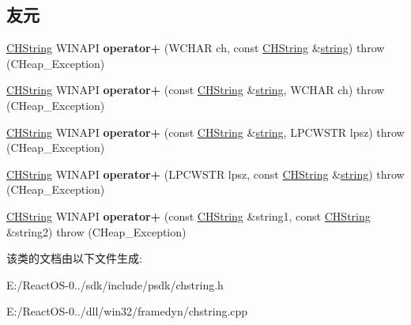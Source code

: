 \subsection*{友元}
\begin{DoxyCompactItemize}
\item 
\mbox{\label{class_c_h_string_af47004e928bdd92e10b5f0346fbd4273}} 
\hyperlink{class_c_h_string}{C\+H\+String} W\+I\+N\+A\+PI {\bfseries operator+} (W\+C\+H\+AR ch, const \hyperlink{class_c_h_string}{C\+H\+String} \&\hyperlink{structstring}{string})  throw (\+C\+Heap\+\_\+\+Exception)
\item 
\mbox{\label{class_c_h_string_a85e60148ad794abec3ebe0998f1c4f03}} 
\hyperlink{class_c_h_string}{C\+H\+String} W\+I\+N\+A\+PI {\bfseries operator+} (const \hyperlink{class_c_h_string}{C\+H\+String} \&\hyperlink{structstring}{string}, W\+C\+H\+AR ch)  throw (\+C\+Heap\+\_\+\+Exception)
\item 
\mbox{\label{class_c_h_string_aaabda75596267e0b9640065e272c1d9f}} 
\hyperlink{class_c_h_string}{C\+H\+String} W\+I\+N\+A\+PI {\bfseries operator+} (const \hyperlink{class_c_h_string}{C\+H\+String} \&\hyperlink{structstring}{string}, L\+P\+C\+W\+S\+TR lpsz)  throw (\+C\+Heap\+\_\+\+Exception)
\item 
\mbox{\label{class_c_h_string_a4c6751dcb981aae3735c1d5ffc8875c8}} 
\hyperlink{class_c_h_string}{C\+H\+String} W\+I\+N\+A\+PI {\bfseries operator+} (L\+P\+C\+W\+S\+TR lpsz, const \hyperlink{class_c_h_string}{C\+H\+String} \&\hyperlink{structstring}{string})  throw (\+C\+Heap\+\_\+\+Exception)
\item 
\mbox{\label{class_c_h_string_a10e7cdcdee9925ac6ea234979468e42c}} 
\hyperlink{class_c_h_string}{C\+H\+String} W\+I\+N\+A\+PI {\bfseries operator+} (const \hyperlink{class_c_h_string}{C\+H\+String} \&string1, const \hyperlink{class_c_h_string}{C\+H\+String} \&string2)  throw (\+C\+Heap\+\_\+\+Exception)
\end{DoxyCompactItemize}


该类的文档由以下文件生成\+:\begin{DoxyCompactItemize}
\item 
E\+:/\+React\+O\+S-\/0../sdk/include/psdk/chstring.\+h\item 
E\+:/\+React\+O\+S-\/0../dll/win32/framedyn/chstring.\+cpp\end{DoxyCompactItemize}
